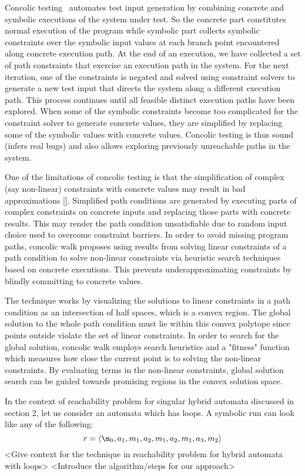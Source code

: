 Concolic testing~\cite{SEN07} automates test input generation by combining concrete and symbolic executions of the system under test. So the concrete part constitutes normal execution of the program while symbolic part collects symbolic constraints over the symbolic input values at each branch point encountered along concrete execution path. At the end of an execution, we have collected a set of path constraints that exercise an execution path in the system. For the next iteration, one of the constraints is negated and solved using constraint solvers to generate a new test input that directs the system along a different execution path. This process continues until all feasible distinct execution paths have been explored. When some of the symbolic constraints become too complicated for the constraint solver to generate concrete values, they are simplified by replacing some of the symbolic values with concrete values.
Concolic testing is thus sound (infers real bugs) and also allows exploring previously unreachable paths in the system. 

One of the limitations of concolic testing is that the simplification of complex (say non-linear) constraints with concrete values may result in bad approximations []. Simplified path conditions are generated by executing parts of complex constraints on concrete inputs and replacing those parts with concrete results. This may render the path condition unsatisfiable due to random input choice used to overcome constraint barriers. In order to avoid missing program paths, concolic walk proposes using results from solving linear constraints of a path condition to solve non-linear constraints via heuristic search techniques based on concrete executions. This prevents underapproximating constraints by blindly committing to concrete values. 

The technique works by visualizing the solutions to linear constraints in a path condition as an intersection of half spaces, which is a convex region. The global solution to the whole path condition must lie within this convex polytope since points outside violate the set of linear constraints. In order to search for the global solution, concolic walk employs search heuristics and a "fitness" function which measures how close the current point is to solving the non-linear constraints. By evaluating terms in the non-linear constraints, global solution search can be guided towards promising regions in the convex solution space.
 
In the context of reachability problem for singular hybrid automata discussed in section 2, let us consider an automata which has loops. A symbolic run can look like any of the following: 
\[
	r = \seq{\m_0, a_1, m_1, a_2, m_1, a_2, m_1, a_3, m_2}
\] 
<Give context for the technique in reachability problem for hybrid automata with loops>  
<Introduce the algorithm/steps for our approach>
